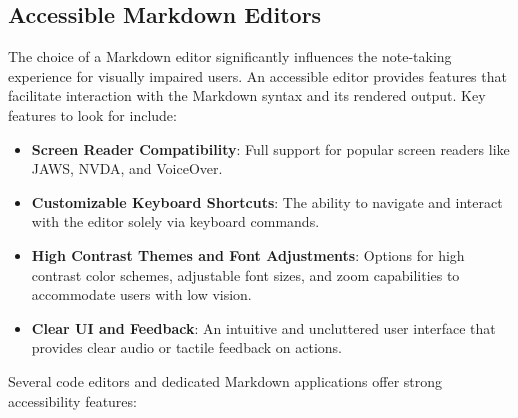\subsection{Accessible Markdown Editors}
The choice of a Markdown editor significantly influences the note-taking experience for visually impaired users. An accessible editor provides features that facilitate interaction with the Markdown syntax and its rendered output. Key features to look for include:
\begin{itemize}
    \item \textbf{Screen Reader Compatibility}: Full support for popular screen readers like JAWS, NVDA, and VoiceOver.\cite{DailyDevEditors}
    \item \textbf{Customizable Keyboard Shortcuts}: The ability to navigate and interact with the editor solely via keyboard commands.\cite{DailyDevEditors}
    \item \textbf{High Contrast Themes and Font Adjustments}: Options for high contrast color schemes, adjustable font sizes, and zoom capabilities to accommodate users with low vision.\cite{ReciteMe}\cite{DailyDevEditors}
    \item \textbf{Clear UI and Feedback}: An intuitive and uncluttered user interface that provides clear audio or tactile feedback on actions.\cite{Inkdrop}\cite{TinyMCE}
\end{itemize}
Several code editors and dedicated Markdown applications offer strong accessibility features:

